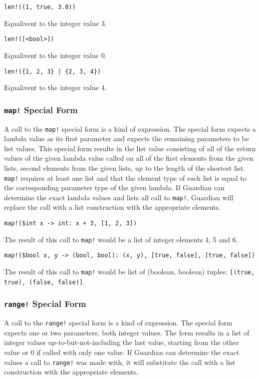 {{		\begin{itemize}
		{
			\item[] \texttt{len!((1, true, 3.0))}
			
				Equalivent to the integer value 3.
			
			\item[] \texttt{len!([<bool>])}
			
				Equalivent to the integer value 0.
			
			\item[] \texttt{len!(\{1, 2, 3\} | \{2, 3, 4\})}
			
				Equalivent to the integer value 4.
		}
		\end{itemize}
	}
	
	\subsubsection{\texttt{map!} Special Form}
	{
		A call to the \texttt{map!} special form is a kind of expression.
		The special form expects a lambda value as its
		first parameter and expects the remaining parameters to be list values.
		This special form results in the list value consisting
		of all of the return values of the given lambda value called on all of the
		first elements from the given lists, second elements from the given
		lists, up to the length of the shortest list.
		\texttt{map!} requires at least one list and that
		the element type of each list is equal to the corresponding parameter type
		of the given lambda.
		If Guardian can determine the exact lambda values and lists all call to
		\texttt{map!}, Guardian will replace the call with a list
		construction with the appropriate elements.
		
		\begin{itemize}
		{
			\item[] \texttt{map!(\$int x -> int: x + 3, [1, 2, 3])}
			
				The result of this call to \texttt{map!} would be a list of
				integer elements 4, 5 and 6.
			
			\item[] \texttt{map!(\$bool x, y -> (bool, bool): (x, y), [true, false], [true, false])}
			
				The result of this call to \texttt{map!} would be list of
				(boolean, boolean) tuples: \texttt{[(true, true), (false, false)]}.
		}
		\end{itemize}
	}
	
	\subsubsection{\texttt{range!} Special Form}
	{
		A call to the \texttt{range!} special form is a kind of expression.
		The special form expects one or two parameters, both integer values.
		The form results in a list of integer values up-to-but-not-including
		the last value, starting from the other value or 0 if called with only
		one value.
		If Guardian can determine the exact values a call to \texttt{range!}
		was made with, it will substitute the call with a list construction
		with the appropriate elements.
		
}}
